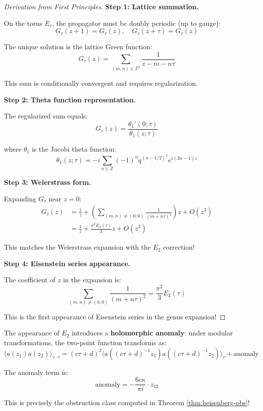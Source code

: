 \begin{proof}[Derivation from First Principles]

\textbf{Step 1: Lattice summation.}

On the torus $E_\tau$, the propagator must be doubly periodic (up to gauge):
$$G_\tau(z + 1) = G_\tau(z), \quad G_\tau(z + \tau) = G_\tau(z)$$

The unique solution is the lattice Green function:
$$G_\tau(z) = \sum_{(m,n) \in \mathbb{Z}^2} \frac{1}{z - m - n\tau}$$

This sum is conditionally convergent and requires regularization.

\textbf{Step 2: Theta function representation.}

The regularized sum equals:
$$G_\tau(z) = \frac{\theta_1'(0; \tau)}{\theta_1(z; \tau)}$$

where $\theta_1$ is the Jacobi theta function:
$$\theta_1(z; \tau) = -i \sum_{n \in \mathbb{Z}} (-1)^n q^{(n-1/2)^2} 
e^{i(2n-1)z}$$

\textbf{Step 3: Weierstrass form.}

Expanding $G_\tau$ near $z=0$:
\begin{align}
G_\tau(z) &= \frac{1}{z} + \left(\sum_{(m,n) \neq (0,0)} \frac{1}{(m+n\tau)^2}\right) z 
+ O(z^3) \\
&= \frac{1}{z} + \frac{\pi^2 E_2(\tau)}{3} z + O(z^3)
\end{align}

This matches the Weierstrass expansion with the $E_2$ correction!

\textbf{Step 4: Eisenstein series appearance.}

The coefficient of $z$ in the expansion is:
$$\sum_{(m,n) \neq (0,0)} \frac{1}{(m+n\tau)^2} = \frac{\pi^2}{3} E_2(\tau)$$

This is the first appearance of Eisenstein series in the genus expansion!
\end{proof}

\begin{remark}\label{rem:E2-holomorphic-anomaly}
The appearance of $E_2$ introduces a \textbf{holomorphic anomaly}: under modular 
transformations, the two-point function transforms as:
\begin{equation}
\langle a(z_1) a(z_2) \rangle_{\gamma \cdot \tau} = (c\tau + d)^2 
\langle a((c\tau+d)^{-1}z_1) a((c\tau+d)^{-1}z_2) \rangle_\tau 
+ \text{anomaly}
\end{equation}

The anomaly term is:
$$\text{anomaly} = -\frac{6c\kappa}{\pi i} \cdot z_{12}$$

This is precisely the obstruction class computed in Theorem \ref{thm:heisenberg-obs}!
\end{remark}

